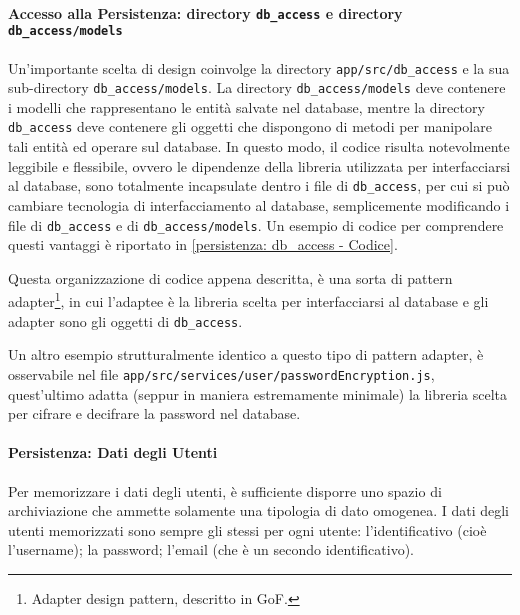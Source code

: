 \paragraph{Accesso alla Persistenza: directory \texttt{db\_access} e directory \texttt{db\_access/models} \paragraphNewline}

\removeHorizontalSpaceSmall Un'importante scelta di design coinvolge la directory \texttt{app/src/db\_access} e la sua sub-directory \texttt{db\_access/models}. La directory \texttt{db\_access/models} deve contenere i modelli che rappresentano le entità salvate nel database, mentre la directory \texttt{db\_access} deve contenere gli oggetti che dispongono di metodi per manipolare tali entità ed operare sul database.
\newline
In questo modo, il codice risulta notevolmente leggibile e flessibile, ovvero le dipendenze della libreria utilizzata per interfacciarsi al database, sono totalmente incapsulate dentro i file di \texttt{db\_access}, per cui si può cambiare tecnologia di interfacciamento al database, semplicemente modificando i file di \texttt{db\_access} e di \texttt{db\_access/models}.
\newline
Un esempio di codice per comprendere questi vantaggi è riportato in \ref{persistenza: db_access - Codice}.

Questa organizzazione di codice appena descritta, è una sorta di pattern adapter\footnote{Adapter design pattern, descritto in GoF\citep{GoF}.}, in cui l'adaptee è la libreria scelta per interfacciarsi al database e gli adapter sono gli oggetti di \texttt{db\_access}.

Un altro esempio strutturalmente identico a questo tipo di pattern adapter, è osservabile nel file \texttt{app/src/services/user/passwordEncryption.js}, quest'ultimo adatta (seppur in maniera estremamente minimale) la libreria scelta per cifrare e decifrare la password nel database.

\newpage

\paragraph{Persistenza: Dati degli Utenti \paragraphNewline}

\removeHorizontalSpaceSmall Per memorizzare i dati degli utenti, è sufficiente disporre uno spazio di archiviazione che ammette solamente una tipologia di dato omogenea. I dati degli utenti memorizzati sono sempre gli stessi per ogni utente: l'identificativo (cioè l'username); la password; l'email (che è un secondo identificativo).

